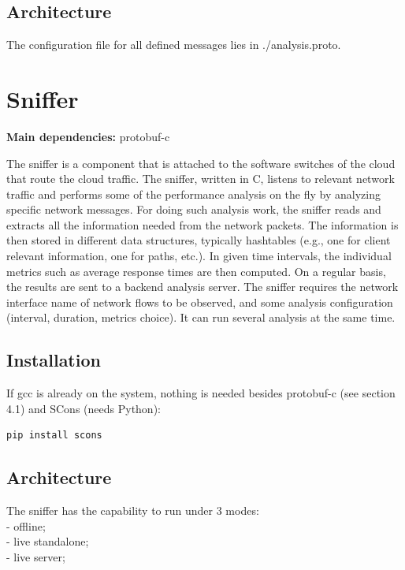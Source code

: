 \documentclass[12pt,hidelinks]{article}
\begin{document}
\subsection{Architecture}
The configuration file for all defined messages lies in ./analysis.proto.

\newpage
\section{Sniffer}	
\vspace{7.5cm}

\textbf{Main dependencies:} protobuf-c

\vspace{3cm}

The sniffer is a component that is attached to the software switches of the cloud that route the cloud traffic. The sniffer, written in C, listens to relevant network traffic and performs some of the performance analysis on the fly by analyzing specific network messages.
For doing such analysis work, the sniffer reads and extracts all the information needed from the network packets. The information is then stored in different data structures, typically hashtables (e.g., one for client relevant information, one for paths, etc.). In given time intervals, the individual metrics such as average response times are then computed. On a regular basis, the results are sent to a backend analysis server.
The sniffer requires the network interface name of network flows to be observed, and some analysis configuration (interval, duration, metrics choice). It can run several analysis at the same time.

\subsection{Installation} 
If gcc is already on the system, nothing is needed besides protobuf-c (see section 4.1) and SCons (needs Python):

\begin{verbatim}
pip install scons
\end{verbatim}

\subsection{Architecture}
The sniffer has the capability to run under 3 modes: \\
    - offline; \\
    - live standalone; \\
    - live server; \\
\end{document}
